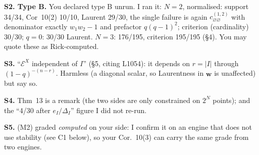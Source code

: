 \documentclass[11pt]{article}
\begin{document}
\textbf{S2. Type B.} You declared type B unrun. I ran it: $N=2$, normalised: support 34/34, Cor~10(2) 10/10, Laurent 29/30, the single
failure is again $c^{(1,2)}_{\varnothing\varnothing}$ with denominator exactly $w_1w_2-1$ and prefactor $q(q-1)^2$; criterion (cardinality) 30/30;
$q=0$: 30/30 Laurent. $N=3$: 176/195, criterion 195/195 (\S4). You may quote these as Rick-computed.

\textbf{S3.} ``$\mathcal E^X$ independent of $I$'' (\S5, citing L1054): it depends on $r=|I|$ through $(1-q)^{-(n-r)}$. Harmless (a diagonal
scalar, so Laurentness in $\mathbf w$ is unaffected) but say so.

\textbf{S4.} Thm~13 is a remark (the two sides are only constrained on $2^N$ points); and the ``4/30 after $e_I/\Delta_I$'' figure I did not re-run.

\textbf{S5.} (M2) graded \emph{computed} on your side: I confirm it on an engine that does not use stability (see C1 below), so your
Cor.~10(3) can carry the same grade from two engines.
\end{document}
